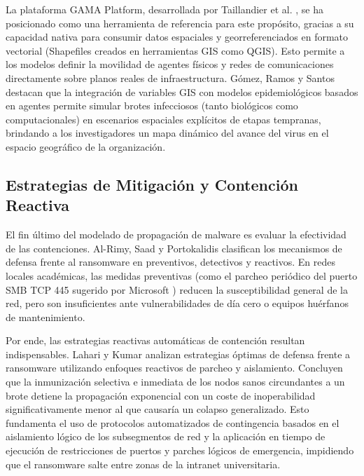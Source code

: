 La plataforma GAMA Platform, desarrollada por Taillandier et al. \cite{taillandier2019gama, amouroux2009gama}, se ha posicionado como una herramienta de referencia para este propósito, gracias a su capacidad nativa para consumir datos espaciales y georreferenciados en formato vectorial (Shapefiles creados en herramientas GIS como QGIS). Esto permite a los modelos definir la movilidad de agentes físicos y redes de comunicaciones directamente sobre planos reales de infraestructura. 
Gómez, Ramos y Santos \cite{gomez2024paradigm} destacan que la integración de variables GIS con modelos epidemiológicos basados en agentes permite simular brotes infecciosos (tanto biológicos como computacionales) en escenarios espaciales explícitos de etapas tempranas, brindando a los investigadores un mapa dinámico del avance del virus en el espacio geográfico de la organización.

\subsection{Estrategias de Mitigación y Contención Reactiva}
El fin último del modelado de propagación de malware es evaluar la efectividad de las contenciones. Al-Rimy, Saad y Portokalidis \cite{al2020ransomware} clasifican los mecanismos de defensa frente al ransomware en preventivos, detectivos y reactivos. En redes locales académicas, las medidas preventivas (como el parcheo periódico del puerto SMB TCP 445 sugerido por Microsoft \cite{microsoft2017ms17010}) reducen la susceptibilidad general de la red, pero son insuficientes ante vulnerabilidades de día cero o equipos huérfanos de mantenimiento.

Por ende, las estrategias reactivas automáticas de contención resultan indispensables. Lahari y Kumar \cite{lahari2025optimal} analizan estrategias óptimas de defensa frente a ransomware utilizando enfoques reactivos de parcheo y aislamiento. Concluyen que la inmunización selectiva e inmediata de los nodos sanos circundantes a un brote detiene la propagación exponencial con un coste de inoperabilidad significativamente menor al que causaría un colapso generalizado. Esto fundamenta el uso de protocolos automatizados de contingencia basados en el aislamiento lógico de los subsegmentos de red y la aplicación en tiempo de ejecución de restricciones de puertos y parches lógicos de emergencia, impidiendo que el ransomware salte entre zonas de la intranet universitaria.
